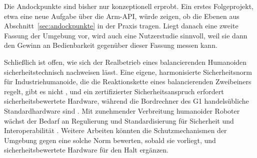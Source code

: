 Die Andockpunkte sind bisher nur konzeptionell erprobt.
Ein erstes Folgeprojekt, etwa eine neue Aufgabe über die Arm-API, würde zeigen, ob die Ebenen aus Abschnitt~\ref{sec:andockpunkte} in der Praxis tragen.
Liegt danach eine zweite Fassung der Umgebung vor, wird auch eine Nutzerstudie sinnvoll, weil sie dann den Gewinn an Bedienbarkeit gegenüber dieser Fassung messen kann.

Schließlich ist offen, wie sich der Realbetrieb eines balancierenden Humanoiden sicherheitstechnisch nachweisen lässt.
Eine eigene, harmonisierte Sicherheitsnorm für Industriehumanoide, die die Reaktionskette eines balancierenden Zweibeiners regelt, gibt es nicht \cite{Ding2026}, und ein zertifizierter Sicherheitsanspruch erfordert sicherheitsbewertete Hardware, während die Bordrechner des G1 handelsübliche Standardhardware sind \cite{Ding2026}.
Mit zunehmender Verbreitung humanoider Roboter wächst der Bedarf an Regulierung und Standardisierung für Sicherheit und Interoperabilität \cite{Tong2024}.
Weitere Arbeiten könnten die Schutzmechanismen der Umgebung gegen eine solche Norm bewerten, sobald sie vorliegt, und sicherheitsbewertete Hardware für den Halt ergänzen.
